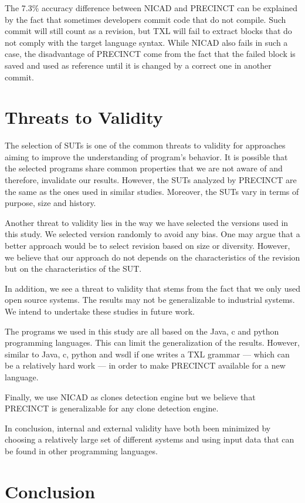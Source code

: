\documentclass[conference]{IEEEtran}
\begin{document}
The 7.3\% accuracy difference between NICAD and PRECINCT can be explained by the fact that sometimes developers commit code that do not compile.
Such commit will still count as a revision, but TXL will fail to extract blocks that do not comply with the target language syntax.
While NICAD also fails in such a case, the disadvantage of PRECINCT come from the fact that the failed block is saved and used as reference until it is changed by a correct one in another commit.

\section{Threats to Validity}
\label{sec:Threats to Validity}

The selection of SUTs is one of the common threats to validity for approaches aiming to improve the understanding of program's behavior.
It is possible that the selected programs share common properties that we are not aware of and therefore, invalidate our results.
However, the SUTs analyzed by PRECINCT are the same as the ones used in similar studies.
Moreover, the SUTs vary in terms of purpose, size and history.

Another threat to validity lies in the way we have selected the versions used in this study.
We selected version randomly to avoid any bias.
One may argue that a better approach would be to select revision based on size or diversity.
However, we believe that our approach do not depends on the characteristics of the revision but on the characteristics of the SUT.

In addition, we see a threat to validity that stems from the fact that we only used open source systems. The results may not be generalizable to industrial systems. We intend to undertake these studies in future work.

The programs we used in this study are all based on the Java, c and python programming languages. This can limit the generalization of the results. However, similar to Java, c, python and wsdl if one writes a TXL grammar --- which can be a relatively hard work --- in order to make PRECINCT available for a new language.

Finally, we use NICAD as clones detection engine but we believe that PRECINCT is generalizable for any clone detection engine.

In conclusion, internal and external validity have both been minimized by choosing a relatively large set of different systems and using input data that can be found in other programming languages.



\section{Conclusion}
\label{sec:Conclusion}









\end{document}
